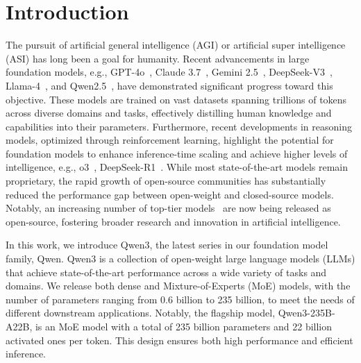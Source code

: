 \section{Introduction}
\label{sec:intro}

The pursuit of artificial general intelligence (AGI) or artificial super intelligence (ASI) has long been a goal for humanity. Recent advancements in large foundation models, e.g., GPT-4o~\citep{gpt4o}, Claude 3.7~\citep{claude3.7}, Gemini 2.5~\citep{gemini2.5}, DeepSeek-V3~\citep{deepseekv3}, Llama-4~\citep{llama4}, and Qwen2.5~\citep{qwen2.5}, have demonstrated significant progress toward this objective. These models are trained on vast datasets spanning trillions of tokens across diverse domains and tasks, effectively distilling human knowledge and capabilities into their parameters. Furthermore, recent developments in reasoning models, optimized through reinforcement learning, highlight the potential for foundation models to enhance inference-time scaling and achieve higher levels of intelligence, e.g., o3~\citep{o3}, DeepSeek-R1~\citep{r1}. While most state-of-the-art models remain proprietary, the rapid growth of open-source communities has substantially reduced the performance gap between open-weight and closed-source models. Notably, an increasing number of top-tier models~\citep{llama4, deepseekv3, r1, qwen2.5} are now being released as open-source, fostering broader research and innovation in artificial intelligence.

In this work, we introduce Qwen3, the latest series in our foundation model family, Qwen. Qwen3 is a collection of open-weight large language models (LLMs) that achieve state-of-the-art performance across a wide variety of tasks and domains. We release both dense and Mixture-of-Experts (MoE) models, with the number of parameters ranging from 0.6 billion to 235 billion, to meet the needs of different downstream applications. Notably, the flagship model, Qwen3-235B-A22B, is an MoE model with a total of 235 billion parameters and 22 billion activated ones per token. This design ensures both high performance and efficient inference.

